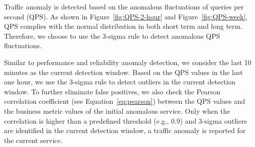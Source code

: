 Traffic anomaly is detected based on the anomalous fluctuations of queries per second (QPS).
As shown in Figure~\ref{fig:QPS-2-hour} and Figure~\ref{fig:QPS-week}, QPS complies with the normal distribution in both short term and long term.
Therefore, we choose to use the 3-sigma rule to detect anomalous QPS fluctuations.

Similar to performance and reliability anomaly detection, we consider the last 10 minutes as the current detection window.
Based on the QPS values in the last one hour, we use the 3-sigma rule to detect outliers in the current detection window.
To further eliminate false positives, we also check the Pearson correlation coefficient (see Equation~\ref{eq:pearson}) between the QPS values and the business metric values of the initial anomalous service.
Only when the correlation is higher than a predefined threshold (e.g., 0.9) and  3-sigma outliers are identified in the current detection window, a traffic anomaly is reported for the current service.



